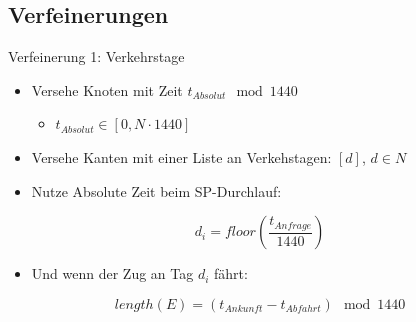 \subsection{Verfeinerungen}
%
%


\begin{frame}{Verfeinerung 1: Verkehrstage}
	\begin{itemize}
		\item Versehe Knoten mit Zeit $t_{Absolut} \mod 1440$
		\begin{itemize}
			\item $t_{Absolut} \in [0, N \cdot 1440]$
		\end{itemize}
		\item Versehe Kanten mit einer Liste an Verkehstagen: $[d]$, $d \in N$
		\item Nutze Absolute Zeit beim SP-Durchlauf:
	\end{itemize}

	\begin{equation*}
		d_i = floor(\frac{t_{Anfrage}}{1440})
	\end{equation*}

	\begin{itemize}
		\item Und wenn der Zug an Tag $d_i$ fährt:
	\end{itemize}

	\begin{equation*}
		length(E) = (t_{Ankunft} - t_{Abfahrt}) \mod 1440
	\end{equation*}
\end{frame}


